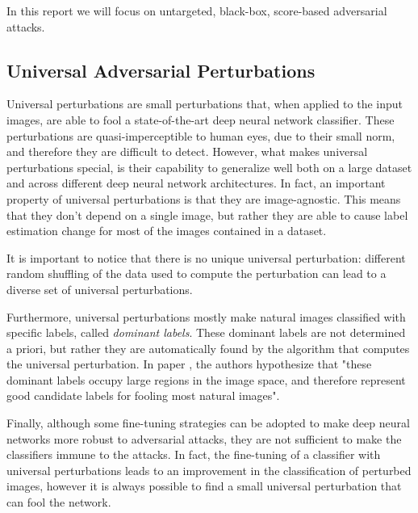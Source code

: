 
In this report we will focus on untargeted, black-box, score-based adversarial attacks.

\subsection{Universal Adversarial Perturbations}
Universal perturbations are small perturbations that, when applied to the input images, are able
to fool a state-of-the-art deep neural network classifier. These perturbations are quasi-imperceptible to human eyes,
due to their small norm, and therefore they are difficult to detect. However, what makes universal perturbations special,
is their capability to generalize well both on a large dataset and across different deep neural network architectures.
In fact, an important property of universal perturbations is that they are image-agnostic. This means that
they don't depend on a single image, but rather they are able to cause label estimation change for most of
the images contained in a dataset.

It is important to notice that there is no unique universal perturbation: different random shuffling of the data used
to compute the perturbation can lead to a diverse set of universal perturbations.

Furthermore, universal perturbations mostly make natural images classified with specific labels, called
\textit{dominant labels}. These dominant labels are not determined a priori, but rather they are automatically
found by the algorithm that computes the universal perturbation. In paper \cite{A2}, the authors
hypothesize that "these dominant labels occupy large regions in the image space, and therefore represent good
candidate labels for fooling most natural images".

Finally, although some fine-tuning strategies can be adopted to make deep neural networks more robust to adversarial
attacks, they are not sufficient to make the classifiers immune to the attacks. In fact, the fine-tuning of a classifier
with universal perturbations leads to an improvement in the classification of perturbed images, however it is always
possible to find a small universal perturbation that can fool the network.




